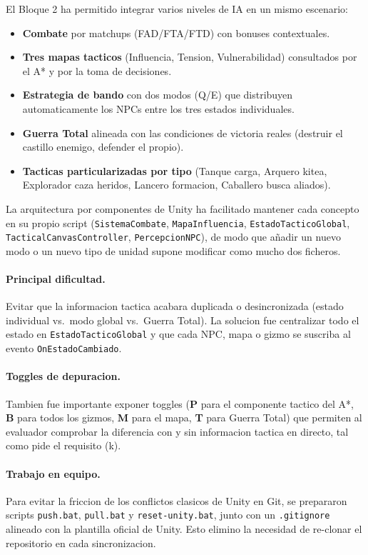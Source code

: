\documentclass[12pt,a4paper]{article}
\begin{document}
El Bloque 2 ha permitido integrar varios niveles de IA en un mismo
escenario:

\begin{itemize}[leftmargin=1.5em]
    \item \textbf{Combate} por matchups (FAD/FTA/FTD) con bonuses contextuales.
    \item \textbf{Tres mapas tacticos} (Influencia, Tension, Vulnerabilidad) consultados por el A* y por la toma de decisiones.
    \item \textbf{Estrategia de bando} con dos modos (Q/E) que distribuyen automaticamente los NPCs entre los tres estados individuales.
    \item \textbf{Guerra Total} alineada con las condiciones de victoria reales (destruir el castillo enemigo, defender el propio).
    \item \textbf{Tacticas particularizadas por tipo} (Tanque carga, Arquero kitea, Explorador caza heridos, Lancero formacion, Caballero busca aliados).
\end{itemize}

La arquitectura por componentes de Unity ha facilitado mantener cada
concepto en su propio script (\texttt{SistemaCombate},
\texttt{MapaInfluencia}, \texttt{EstadoTacticoGlobal},
\texttt{TacticalCanvasController}, \texttt{PercepcionNPC}), de modo
que añadir un nuevo modo o un nuevo tipo de unidad supone modificar
como mucho dos ficheros.

\paragraph{Principal dificultad.}
Evitar que la informacion tactica acabara duplicada o desincronizada
(estado individual vs.\ modo global vs.\ Guerra Total). La solucion
fue centralizar todo el estado en \texttt{EstadoTacticoGlobal} y que
cada NPC, mapa o gizmo se suscriba al evento \texttt{OnEstadoCambiado}.

\paragraph{Toggles de depuracion.}
Tambien fue importante exponer toggles (\textbf{P} para el componente
tactico del A*, \textbf{B} para todos los gizmos, \textbf{M} para el
mapa, \textbf{T} para Guerra Total) que permiten al evaluador comprobar
la diferencia con y sin informacion tactica en directo, tal como pide
el requisito (k).

\paragraph{Trabajo en equipo.}
Para evitar la friccion de los conflictos clasicos de Unity en Git, se
prepararon scripts \texttt{push.bat}, \texttt{pull.bat} y
\texttt{reset-unity.bat}, junto con un \texttt{.gitignore} alineado
con la plantilla oficial de Unity. Esto elimino la necesidad de
re-clonar el repositorio en cada sincronizacion.
\end{document}
